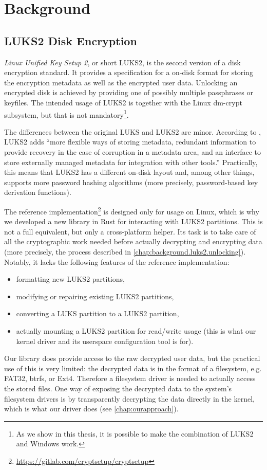\section{Background}
\label{chap:background}

\subsection{LUKS2 Disk Encryption}
\label{chap:background.luks2}
\emph{Linux Unified Key Setup 2}, or short LUKS2, is the second version of a disk encryption standard. It provides a specification \cite{Broz2018} for a on-disk format for storing the encryption metadata as well as the encrypted user data. Unlocking an encrypted disk is achieved by providing one of possibly multiple passphrases or keyfiles. The intended usage of LUKS2 is together with the Linux dm-crypt subsystem, but that is not mandatory\footnote{\label{fn:luks2windows} As we show in this thesis, it is possible to make the combination of LUKS2 and Windows work.}.

The differences between the original LUKS and LUKS2 are minor. According to \cite{Broz2018}, LUKS2 adds ``more flexible ways of storing metadata, redundant information to provide recovery in the case of corruption in a metadata area, and an interface to store externally managed metadata for integration with other tools.'' Practically, this means that LUKS2 has a different on-disk layout and, among other things, supports more password hashing algorithms (more precisely, password-based key derivation functions).

The reference implementation\footnote{\label{fn:background.luks2.referenceimpl} \url{https://gitlab.com/cryptsetup/cryptsetup}} is designed only for usage on Linux, which is why we developed a new library in Rust for interacting with LUKS2 partitions. This is not a full equivalent, but only a cross-platform helper. Its task is to take care of all the cryptographic work needed before actually decrypting and encrypting data (more precisely, the process described in \autoref{chap:background.luks2.unlocking}). Notably, it lacks the following features of the reference implementation:
\begin{itemize}[label=\textbf{--}]
	\item formatting new LUKS2 partitions,
	\item modifying or repairing existing LUKS2 partitions,
	\item converting a LUKS partition to a LUKS2 partition,
	\item actually mounting a LUKS2 partition for read/write usage (this is what our kernel driver and its userspace configuration tool is for).
\end{itemize}
Our library does provide access to the raw decrypted user data, but the practical use of this is very limited: the decrypted data is in the format of a filesystem, e.g. FAT32, btrfs, or Ext4. Therefore a filesystem driver is needed to actually access the stored files. One way of exposing the decrypted data to the system's filesystem drivers is by transparently decrypting the data directly in the kernel, which is what our driver does (see \autoref{chap:ourapproach}).


